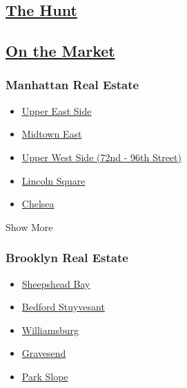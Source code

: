 \hypertarget{the-hunt}{%
\subsection{\texorpdfstring{\href{https://www.nytimes3xbfgragh.onion/column/on-the-market}{The
Hunt}}{The Hunt}}\label{the-hunt}}

\hypertarget{on-the-market}{%
\subsection{\texorpdfstring{\href{https://www.nytimes3xbfgragh.onion/column/on-the-market}{On
the Market}}{On the Market}}\label{on-the-market}}

\hypertarget{manhattan-real-estate}{%
\subsubsection{Manhattan Real Estate}\label{manhattan-real-estate}}

\begin{itemize}
\tightlist
\item
  \href{/real-estate/usa/ny/new-york/upper-east-side/homes-for-sale}{Upper
  East Side}
\item
  \href{/real-estate/usa/ny/new-york/midtown-east/homes-for-sale}{Midtown
  East}
\item
  \href{/real-estate/usa/ny/new-york/upper-west-side-(72nd-96th-street)/homes-for-sale}{Upper
  West Side (72nd - 96th Street)}
\item
  \href{/real-estate/usa/ny/new-york/lincoln-square/homes-for-sale}{Lincoln
  Square}
\item
  \href{/real-estate/usa/ny/new-york/chelsea/homes-for-sale}{Chelsea}
\end{itemize}

Show More

\hypertarget{brooklyn-real-estate}{%
\subsubsection{Brooklyn Real Estate}\label{brooklyn-real-estate}}

\begin{itemize}
\tightlist
\item
  \href{/real-estate/usa/ny/brooklyn/sheepshead-bay/homes-for-sale}{Sheepshead
  Bay}
\item
  \href{/real-estate/usa/ny/brooklyn/bedford-stuyvesant/homes-for-sale}{Bedford
  Stuyvesant}
\item
  \href{/real-estate/usa/ny/brooklyn/williamsburg/homes-for-sale}{Williamsburg}
\item
  \href{/real-estate/usa/ny/brooklyn/gravesend/homes-for-sale}{Gravesend}
\item
  \href{/real-estate/usa/ny/brooklyn/park-slope/homes-for-sale}{Park
  Slope}
\end{itemize}

